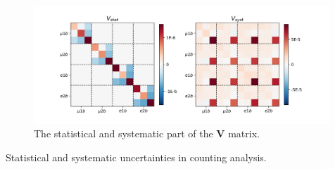 \begin{figure}[ht]
    \centering
    \includegraphics[width=0.99\textwidth]{chapters/Analysis/sectionSystematics/figures/covarMatrix_total.png}
    \caption{ The statistical and systematic part of the $\textbf{V}$ matrix. }
    \label{fig:corBetaBar}
\end{figure}

\begin{table}[]
  \renewcommand{\arraystretch}{1.1}
  \setlength{\tabcolsep}{0.4em}
  \centering
  \caption{ Statistical and systematic uncertainties in counting analysis. }
  \resizebox{\textwidth}{!}{}
 
  \label{tab:syst_alt}
\end{table}



\FloatBarrier






